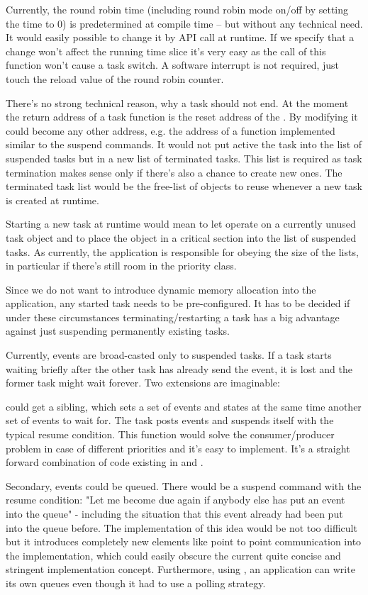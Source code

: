 Currently, the round robin time (including round robin mode on/off by
setting the time to 0) is predetermined at compile time -- but without any
technical need. It would easily possible to change it by API call at
runtime. If we specify that a change won't affect the running time slice
it's very easy as the call of this function won't cause a task switch. A
software interrupt is not required, just touch the reload value of the
round robin counter.

There's no strong technical reason, why a task should not end. At the
moment the return address of a task function is the reset address of the
\uC{}. By modifying  it could become any other
address, e.g. the address of a function implemented similar to the suspend
commands. It would not put active the task into the list of suspended
tasks but in a new list of terminated tasks. This list is required as task
termination makes sense only if there's also a chance to create new ones.
The terminated task list would be the free-list of objects to reuse
whenever a new task is created at runtime.

Starting a new task at runtime would mean to let 
operate on a currently unused task object and to place the object in a
critical section into the list of suspended tasks. As currently, the
application is responsible for obeying the size of the lists, in
particular if there's still room in the priority class.

Since we do not want to introduce dynamic memory allocation into the
application, any started task needs to be pre-configured. It has to be
decided if under these circumstances terminating/restarting a task has a
big advantage against just suspending permanently existing tasks.

Currently, events are broad-casted only to suspended tasks. If a task
starts waiting briefly after the other task has already send the event, it
is lost and the former task might wait forever. Two extensions are
imaginable:

 could get a sibling, which sets a set of events and
states at the same time another set of events to wait for. The task posts
events and suspends itself with the typical resume condition. This
function would solve the consumer/producer problem in case of different
priorities and it's easy to implement. It's a straight forward combination
of code existing in  and .

Secondary, events could be queued. There would be a suspend command with
the resume condition: "Let me become due again if anybody else has put an
event into the queue" - including the situation that this event already
had been put into the queue before. The implementation of this idea would
be not too difficult but it introduces completely new elements like point
to point communication into the implementation, which could easily obscure
the current quite concise and stringent implementation concept.
Furthermore, using , an \rtos{}
application can write its own queues even though it had to use a polling
strategy.




